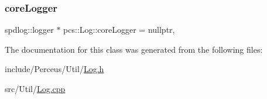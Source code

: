 \subsubsection{\texorpdfstring{core\+Logger}{coreLogger}}
{\footnotesize\ttfamily spdlog\+::logger $\ast$ pcs\+::\+Log\+::core\+Logger = nullptr\hspace{0.3cm}{\ttfamily [static]}, {\ttfamily [private]}}



The documentation for this class was generated from the following files\+:\begin{DoxyCompactItemize}
\item 
include/\+Perceus/\+Util/\hyperlink{Log_8h}{Log.\+h}\item 
src/\+Util/\hyperlink{Log_8cpp}{Log.\+cpp}\end{DoxyCompactItemize}
